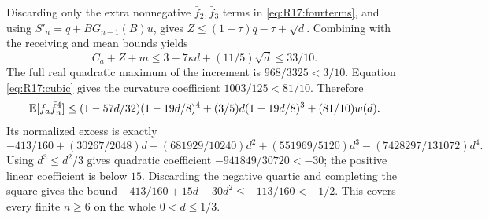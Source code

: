 Discarding only the extra nonnegative $\bar f_2,\bar f_3$ terms in
\eqref{eq:R17:fourterms}, and using
$S'_n=q+BG_{n-1}(B)u$, gives
$Z\le(1-\tau)q-\tau+\sqrt d$.
Combining with the receiving and mean bounds yields
\[
C_a+Z+m\le3-7\kappa d+(11/5)\sqrt d\le33/10.
\]
The full real quadratic maximum of the increment is
$968/3325<3/10$. Equation \eqref{eq:R17:cubic} gives the curvature
coefficient $1003/125<81/10$. Therefore
\[
\mathbb E[f_a\bar f_n^4]\le(1-57d/32)(1-19d/8)^4
+(3/5)d(1-19d/8)^3+(81/10)w(d).
\]
Its normalized excess is exactly
\[
-413/160+(30267/2048)d-(681929/10240)d^2
+(551969/5120)d^3-(7428297/131072)d^4.
\]
Using $d^3\le d^2/3$ gives quadratic coefficient
$-941849/30720<-30$; the positive linear coefficient is below $15$.
Discarding the negative quartic and completing the square gives the
bound $-413/160+15d-30d^2\le-113/160<-1/2$.
This covers every finite $n\ge6$ on the whole $0<d\le1/3$.

